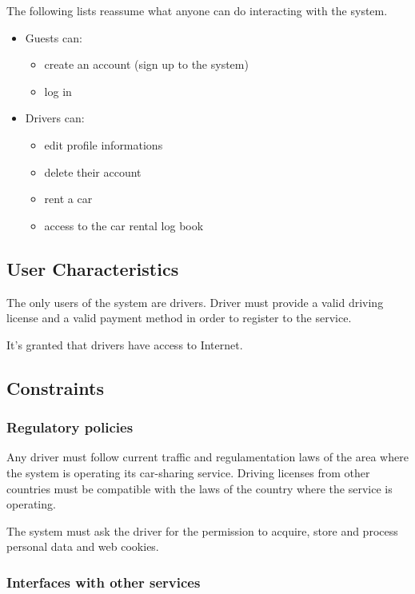 The following lists reassume what anyone can do interacting with the system.
\begin{itemize}
	\item Guests can:
	\begin{itemize}
		\item create an account (sign up to the system)
		\item log in
	\end{itemize}
	\item Drivers can:
	\begin{itemize}
		\item edit profile informations
		\item delete their account
		\item rent a car
		\item access to the car rental log book
	\end{itemize}
\end{itemize}

\subsection{User Characteristics}

The only users of the system are drivers. Driver must provide a valid driving license and a valid payment method in order to register to the service.

It's granted that drivers have access to Internet.

\subsection{Constraints}

\subsubsection{Regulatory policies}
Any driver must follow current traffic and regulamentation laws of the area where the system is operating its car-sharing service. Driving licenses from other countries must be compatible with the laws of the country where the service is operating.

The system must ask the driver for the permission to acquire, store and process personal data and web cookies.

\subsubsection{Interfaces with other services}


